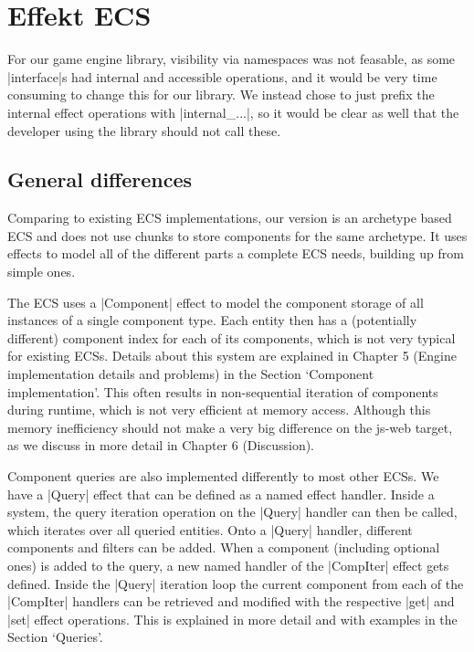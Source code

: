 \chapter{Effekt ECS}\label{chap:ecs}

For our game engine library, visibility via namespaces was not feasable, as some |interface|s had internal and accessible operations, and it would be very time consuming to change this for our library. We instead chose to just prefix the internal effect operations with |internal_...|, so it would be clear as well that the developer using the library should not call these.

\section{General differences}

Comparing to existing ECS implementations, our version is an archetype based ECS and does not use chunks to store components for the same archetype. It uses effects to model all of the different parts a complete ECS needs, building up from simple ones.

The ECS uses a |Component| effect to model the component storage of all instances of a single component type. Each entity then has a (potentially different) component index for each of its components, which is not very typical for existing ECSs. Details about this system are explained in Chapter 5 (Engine implementation details and problems) in the Section `Component implementation'. This often results in non-sequential iteration of components during runtime, which is not very efficient at memory access. Although this memory inefficiency should not make a very big difference on the \textsf{js-web} target, as we discuss in more detail in Chapter 6 (Discussion).

Component queries are also implemented differently to most other ECSs. We have a |Query| effect that can be defined as a named effect handler. Inside a system, the query iteration operation on the |Query| handler can then be called, which iterates over all queried entities. Onto a |Query| handler, different components and filters can be added. When a component (including optional ones) is added to the query, a new named handler of the |CompIter| effect gets defined. Inside the |Query| iteration loop the current component from each of the |CompIter| handlers can be retrieved and modified with the respective |get| and |set| effect operations. This is explained in more detail and with examples in the Section `Queries'.

